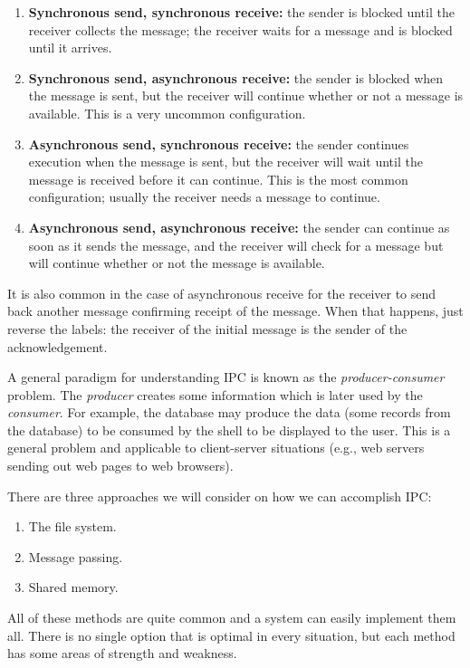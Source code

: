 \begin{enumerate}
	\item \textbf{Synchronous send, synchronous receive:} the sender is blocked until the receiver collects the message; the receiver waits for a message and is blocked until it arrives.
	\item \textbf{Synchronous send, asynchronous receive:} the sender is blocked when the message is sent, but the receiver will continue whether or not a message is available. This is a very uncommon configuration.
	\item \textbf{Asynchronous send, synchronous receive:} the sender continues execution when the message is sent, but the receiver will wait until the message is received before it can continue. This is the most common configuration; usually the receiver needs a message to continue.
	\item \textbf{Asynchronous send, asynchronous receive:} the sender can continue as soon as it sends the message, and the receiver will check for a message but will continue whether or not the message is available.
\end{enumerate}

It is also common in the case of asynchronous receive for the receiver to send back another message confirming receipt of the message. When that happens, just reverse the labels: the receiver of the initial message is the sender of the acknowledgement.

A general paradigm for understanding IPC is known as the \textit{producer-consumer} problem. The \textit{producer} creates some information which is later used by the \textit{consumer}. For example, the database may produce the data (some records from the database) to be consumed by the shell to be displayed to the user. This is a general problem and applicable to client-server situations (e.g., web servers sending out web pages to web browsers).

There are three approaches we will consider on how we can accomplish IPC:
\begin{enumerate}
	\item The file system.
	\item Message passing.
	\item Shared memory.
\end{enumerate}

All of these methods are quite common and a system can easily implement them all. There is no single option that is optimal in every situation, but each method has some areas of strength and weakness.


